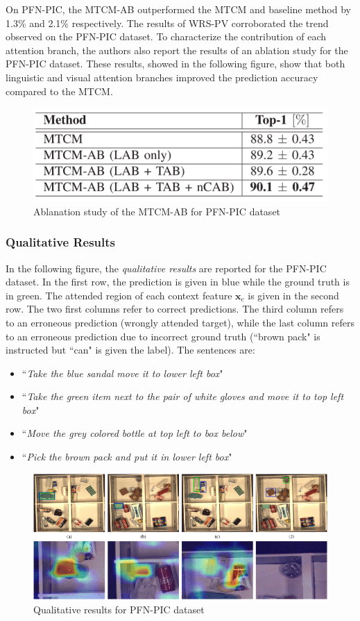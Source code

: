 On PFN-PIC, the MTCM-AB outperformed the MTCM and baseline method by
1.3\% and 2.1\% respectively. The results of WRS-PV corroborated the
trend observed on the PFN-PIC dataset. To characterize the contribution
of each attention branch, the authors also report the results of an
ablation study for the PFN-PIC dataset. These results, showed in the
following figure, show that both linguistic and visual attention
branches improved the prediction accuracy compared to the MTCM.

\begin{figure}[h!]
\centering
\includegraphics[width=0.75\linewidth]{images/MTCMablanation.png}
\caption{Ablanation study of the MTCM-AB for PFN-PIC dataset}
\end{figure}

\subsubsection{Qualitative Results}\label{header-n330}

In the following figure, the \emph{qualitative results} are reported for
the PFN-PIC dataset. In the first row, the prediction is given in blue
while the ground truth is in green. The attended region of each context
feature ${\mathbf x}_c$ is given in the second row. The two first columns
refer to correct predictions. The third column refers to an erroneous
prediction (wrongly attended target), while the last column refers to an
erroneous prediction due to incorrect ground truth (``brown pack" is
instructed but ``can" is given the label). The sentences are:

\begin{itemize}
\item
  ``\emph{Take the blue sandal move it to lower left box}"
\item
  ``\emph{Take the green item next to the pair of white gloves and move
  it to top left box}"
\item
  ``\emph{Move the grey colored bottle at top left to box below}"
\item
  ``\emph{Pick the brown pack and put it in lower left box}"
\end{itemize}
\newpage
\begin{figure}[h!]
\centering
\includegraphics[width=0.8\linewidth]{images/MTMCqualres1.png}
\caption{Qualitative results for PFN-PIC dataset}
\end{figure}


